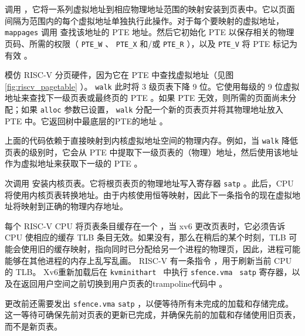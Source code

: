 \documentclass[UTF8]{article}
\begin{document}
        调用
        ，它将一系列虚拟地址到相应物理地址范围的映射安装到页表中。它以页面间隔为范围内的每个虚拟地址单独执行此操作。对于每个要映射的虚拟地址，
    \lstinline{mappages}    调用
        查找该地址的 PTE 地址。然后它初始化 PTE 以保存相关的物理页码、所需的权限（    \lstinline{PTE_W}    、
    \lstinline{PTE_X}    和/或
    \lstinline{PTE_R}    ），以及
    \lstinline{PTE_V}    将 PTE 标记为有效
        。  

        模仿 RISC-V 分页硬件，因为它在 PTE 中查找虚拟地址（见图    \ref{fig:riscv_pagetable}   ）。
    \lstinline{walk}    此时将 3 级页表下降 9 位。它使用每级的 9 位虚拟地址来查找下一级页表或最终页的 PTE
        。如果 PTE 无效，则所需的页面尚未分配；如果
    \lstinline{alloc}    参数已设置，
    \lstinline{walk}    分配一个新的页表页并将其物理地址放入 PTE 中。它返回树中最底层的PTE的地址
       。  

上面的代码依赖于直接映射到内核虚拟地址空间的物理内存。例如，当    \lstinline{walk}    降低页表的级别时，它会从 PTE        中提取下一级页表的（物理）地址，然后使用该地址作为虚拟地址来获取下一级的 PTE
        。  

       次调用
        安装内核页表。它将根页表页的物理地址写入寄存器
    \texttt{satp}    。此后，CPU 将使用内核页表转换地址。由于内核使用恒等映射，因此下一条指令的现在虚拟地址将映射到正确的物理内存地址。  

每个 RISC-V CPU 将页表条目缓存在一个
        ，当 xv6 更改页表时，它必须告诉 CPU 使相应的缓存 TLB 条目无效。如果没有，那么在稍后的某个时刻，TLB 可能会使用旧的缓存映射，指向同时已分配给另一个进程的物理页，因此，进程可能能够在其他进程的内存上乱写乱画。 RISC-V 有一条指令       ，用于刷新当前 CPU 的 TLB。 Xv6重新加载后在 {    \tt    kvminithart   } 中执行 {    \tt    sfence.vma   } 
    \texttt{satp}   寄存器，以及在返回用户空间之前切换到用户页表的trampoline代码中
        。  

更改前还需要发出    \texttt{sfence.vma}   
    \texttt{satp}    ，以便等待所有未完成的加载和存储完成。这一等待可确保先前对页表的更新已完成，并确保先前的加载和存储使用旧页表，而不是新页表。  
\end{document}
